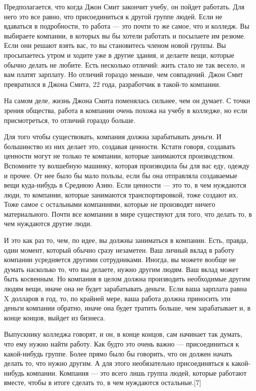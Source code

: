 \documentclass[ebook,12pt,oneside,openany]{memoir}
\begin{document}
Предполагается, что когда Джон Смит закончит учебу, он пойдет
работать. Для него это все равно, что присоединиться к другой группе
людей. Если не вдаваться в подробности, то работа — это почти то же
самое, что и колледж. Вы выбираете компании, в которых вы бы хотели
работать и посылаете им резюме. Если они решают взять вас, то вы
становитесь членом новой группы. Вы просыпаетесь утром и ходите уже в
другие здания, и делаете вещи, которые обычно делать не любите. Есть
несколько отличий: жить стало не так весело, и вам платят зарплату. Но
отличий гораздо меньше, чем совпадений. Джон Смит превратился в Джона
Смита, 22 года, разработчик в такой-то компании.

На самом деле, жизнь Джона Смита поменялась сильнее, чем он думает. С
точки зрения общества, работа в компании очень похожа на учебу в
колледже, но если присмотреться, то отличий гораздо больше.

Для того чтобы существовать, компания должна зарабатывать деньги. И
большинство из них делает это, создавая ценности. Кстати говоря,
создавать ценности могут не только те компании, которые занимаются
производством. Вспомните ту волшебную машинку, которая производила бы
для вас еду, одежду и прочее. От нее было бы мало пользы, если бы она
отправляла создаваемые вещи куда-нибудь в Среднюю Азию. Если ценности
— это то, в чем нуждаются люди, то компании, которые занимаются
транспортировкой, тоже создают их. Тоже самое с остальными компаниями,
которые не производят ничего материального. Почти все компании в мире
существуют для того, что делать то, в чем нуждаются другие люди.

И это как раз то, чем, по идее, вы должны заниматься в компании. Есть,
правда, один момент, который обычно сразу незаметен. Ваш личный вклад
в работу компании усредняется другими сотрудниками. Иногда, вы можете
вообще не думать насколько то, что вы делаете, нужно другим людям. Ваш
вклад может быть косвенным. Но компания в целом должна производить
необходимые другим людям вещи, иначе она не будет зарабатывать деньги.
Если ваша зарплата равна X долларов в год, то, по крайней мере, ваша
работа должна приносить эти деньги компании обратно, иначе она будет
тратить больше, чем зарабатывает и, в конце концов, выйдет из бизнеса.

Выпускнику колледжа говорят, и он, в конце концов, сам начинает так
думать, что ему нужно найти работу. Как будто это очень важно —
присоединиться к какой-нибудь группе. Более прямо было бы говорить,
что он должен начать делать то, что нужно другим. А для этого
необязательно присоединяться к какой-нибудь компании. Компания — это
всего лишь группа людей, которые работают вместе, чтобы в итоге
сделать то, в чем нуждаются остальные.[7]
\end{document}
